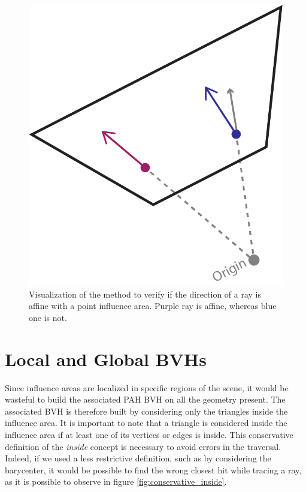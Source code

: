 \documentclass{PoliMi_MasterThesis}
\begin{document}
\begin{figure}[]
    \centering
    \includegraphics[width=\textwidth*\real{0.35}]{Images/direction_affinity.png}
    \caption{Visualization of the method to verify if the direction of a ray is affine with a point influence area. Purple ray is affine, whereas blue one is not.}
    \label{fig:affine_direction}
\end{figure}

\section{Local and Global BVHs} \label{sec:local_and_global_bvhs}

Since influence areas are localized in specific regions of the scene, it would be wasteful to build the associated PAH BVH on all the geometry present. The associated BVH is therefore built by considering only the triangles inside the influence area. It is important to note that a triangle is considered inside the influence area if at least one of its vertices or edges is inside. This conservative definition of the \textit{inside} concept is necessary to avoid errors in the traversal. Indeed, if we used a less restrictive definition, such as by considering the barycenter, it would be possible to find the wrong closest hit while tracing a ray, as it is possible to observe in figure \ref{fig:conservative_inside}.
\end{document}
